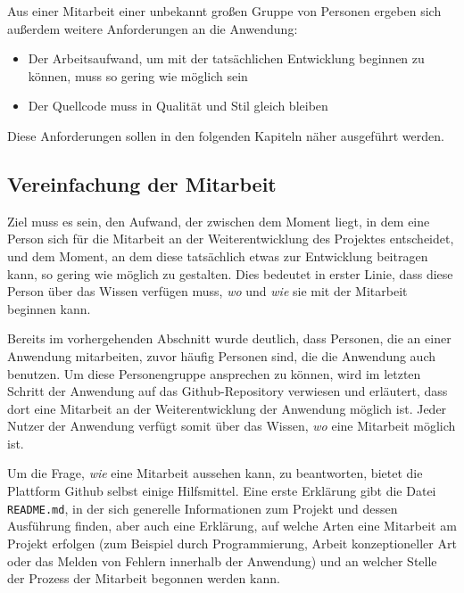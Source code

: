 Aus einer Mitarbeit einer unbekannt großen Gruppe von Personen ergeben sich außerdem weitere Anforderungen an die Anwendung:

\begin{itemize}
  \item Der Arbeitsaufwand, um mit der tatsächlichen Entwicklung beginnen zu können, muss so gering wie möglich sein
  \item Der Quellcode muss in Qualität und Stil gleich bleiben
\end{itemize}

Diese Anforderungen sollen in den folgenden Kapiteln näher ausgeführt werden.

\subsection{Vereinfachung der Mitarbeit}
\label{chap:contribution}
Ziel muss es sein, den Aufwand, der zwischen dem Moment liegt, in dem eine Person sich für die Mitarbeit an der Weiterentwicklung des Projektes entscheidet, und dem Moment, an dem diese tatsächlich etwas zur Entwicklung beitragen kann, so gering wie möglich zu gestalten.
Dies bedeutet in erster Linie, dass diese Person über das Wissen verfügen muss, \textit{wo} und \textit{wie} sie mit der Mitarbeit beginnen kann.

Bereits im vorhergehenden Abschnitt wurde deutlich, dass Personen, die an einer Anwendung mitarbeiten, zuvor häufig Personen sind, die die Anwendung auch benutzen. Um diese Personengruppe ansprechen zu können, wird im letzten Schritt der Anwendung auf das Github-Repository verwiesen und erläutert, dass dort eine Mitarbeit an der Weiterentwicklung der Anwendung möglich ist. Jeder Nutzer der Anwendung verfügt somit über das Wissen, \textit{wo} eine Mitarbeit möglich ist.

Um die Frage, \textit{wie} eine Mitarbeit aussehen kann, zu beantworten, bietet die Plattform Github selbst einige Hilfsmittel\footnotemark{}.
Eine erste Erklärung gibt die Datei \verb|README.md|, in der sich generelle Informationen zum Projekt und dessen Ausführung finden, aber auch eine Erklärung, auf welche Arten eine Mitarbeit am Projekt erfolgen (zum Beispiel durch Programmierung, Arbeit konzeptioneller Art oder das Melden von Fehlern innerhalb der Anwendung) und an welcher Stelle der Prozess der Mitarbeit begonnen werden kann.



